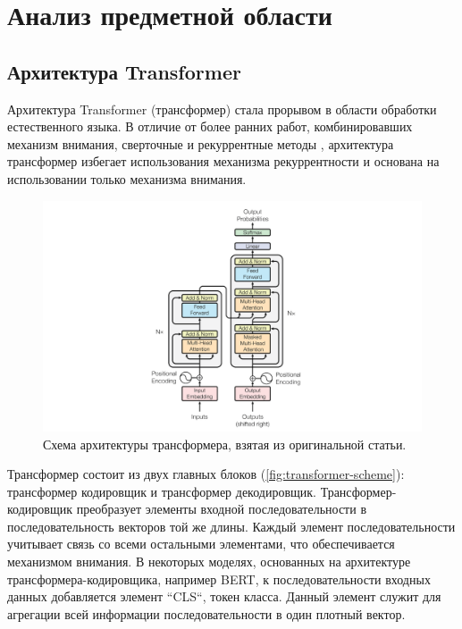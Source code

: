 \section{Анализ предметной области}
\subsection{Архитектура Transformer}

Архитектура Transformer\cite{transformer} (трансформер) стала прорывом в области обработки естественного языка. В отличие от более ранних работ, комбинировавших механизм внимания, сверточные и рекуррентные методы \cite{lstm_cnn_attention_model}, архитектура трансформер избегает использования механизма рекуррентности и основана на использовании только механизма внимания.


\begin{figure}[H]
    \centering
    \includegraphics[width=1.0\textwidth]
    {images/domain_analysis/transformer_scheme.png}
    \caption{Схема архитектуры трансформера, взятая из оригинальной статьи.}
    \label{fig:transformer-scheme}
\end{figure}


Трансформер состоит из двух главных блоков (\autoref{fig:transformer-scheme}): трансформер кодировщик и трансформер декодировщик. Трансформер-кодировщик преобразует элементы входной последовательности в последовательность векторов той же длины. Каждый элемент последовательности учитывает связь со всеми остальными элементами, что обеспечивается механизмом внимания. В некоторых моделях, основанных на архитектуре трансформера-кодировщика, например BERT\cite{bert}, к последовательности входных данных добавляется элемент ``CLS``, токен класса. Данный элемент служит для агрегации всей информации последовательности в один плотный вектор.

